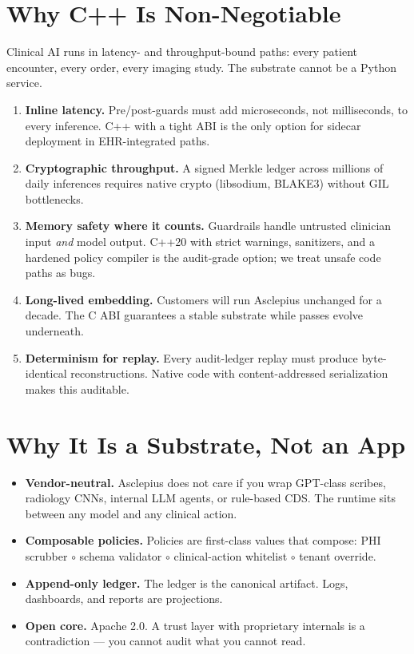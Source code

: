 \documentclass[11pt,a4paper]{article}
\begin{document}
\section{Why C++ Is Non-Negotiable}

Clinical AI runs in latency- and throughput-bound paths: every patient encounter, every order, every imaging study. The substrate cannot be a Python service.

\begin{enumerate}[leftmargin=1.4em]
  \item \textbf{Inline latency.} Pre/post-guards must add microseconds, not milliseconds, to every inference. C++ with a tight ABI is the only option for sidecar deployment in EHR-integrated paths.
  \item \textbf{Cryptographic throughput.} A signed Merkle ledger across millions of daily inferences requires native crypto (libsodium, BLAKE3) without GIL bottlenecks.
  \item \textbf{Memory safety where it counts.} Guardrails handle untrusted clinician input \emph{and} model output. C++20 with strict warnings, sanitizers, and a hardened policy compiler is the audit-grade option; we treat unsafe code paths as bugs.
  \item \textbf{Long-lived embedding.} Customers will run Asclepius unchanged for a decade. The C ABI guarantees a stable substrate while passes evolve underneath.
  \item \textbf{Determinism for replay.} Every audit-ledger replay must produce byte-identical reconstructions. Native code with content-addressed serialization makes this auditable.
\end{enumerate}

\section{Why It Is a Substrate, Not an App}

\begin{itemize}[leftmargin=1.2em]
  \item \textbf{Vendor-neutral.} Asclepius does not care if you wrap GPT-class scribes, radiology CNNs, internal LLM agents, or rule-based CDS. The runtime sits between any model and any clinical action.
  \item \textbf{Composable policies.} Policies are first-class values that compose: PHI scrubber $\circ$ schema validator $\circ$ clinical-action whitelist $\circ$ tenant override.
  \item \textbf{Append-only ledger.} The ledger is the canonical artifact. Logs, dashboards, and reports are projections.
  \item \textbf{Open core.} Apache 2.0. A trust layer with proprietary internals is a contradiction --- you cannot audit what you cannot read.
\end{itemize}
\end{document}
